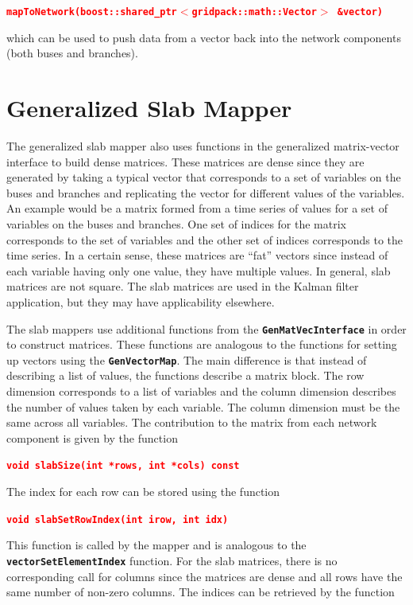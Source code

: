 \documentclass[12pt]{report} %
\begin{document}
\textcolor{red}{\texttt{\textbf{mapToNetwork(boost::shared\_ptr$\boldsymbol{\mathrm{<}}$gridpack::math::Vector$\boldsymbol{\mathrm{>}}$ \&vector)}}}

which can be used to push data from a vector back into the network components (both buses and branches).

\chapter{Generalized Slab Mapper}

The generalized slab mapper also uses functions in the generalized matrix-vector interface to build dense matrices. These matrices are dense since they are generated by taking a typical vector that corresponds to a set of variables on the buses and branches and replicating the vector for different values of the variables. An example would be a matrix formed from a time series of values for a set of variables on the buses and branches. One set of indices for the matrix corresponds to the set of variables and the other set of indices corresponds to the time series. In a certain sense, these matrices are ``fat'' vectors since instead of each variable having only one value, they have multiple values. In general, slab matrices are not square. The slab matrices are used in the Kalman filter application, but they may have applicability elsewhere.

The slab mappers use additional functions from the \texttt{\textbf{GenMatVecInterface}} in order to construct matrices. These functions are analogous to the functions for setting up vectors using the \texttt{\textbf{GenVectorMap}}. The main difference is that instead of describing a list of values, the functions describe a matrix block. The row dimension corresponds to a list of variables and the column dimension describes the number of values taken by each variable. The column dimension must be the same across all variables. The contribution to the matrix from each network component is given by the function

\textcolor{red}{\texttt{\textbf{void slabSize(int *rows, int *cols) const}}}

The index for each row can be stored using the function

\textcolor{red}{\texttt{\textbf{void slabSetRowIndex(int irow, int idx)}}}

This function is called by the mapper and is analogous to the \texttt{\textbf{vectorSetElementIndex}} function. For the slab matrices, there is no corresponding call for columns since the matrices are dense and all rows have the same number of non-zero columns. The indices can be retrieved by the function
\end{document}
